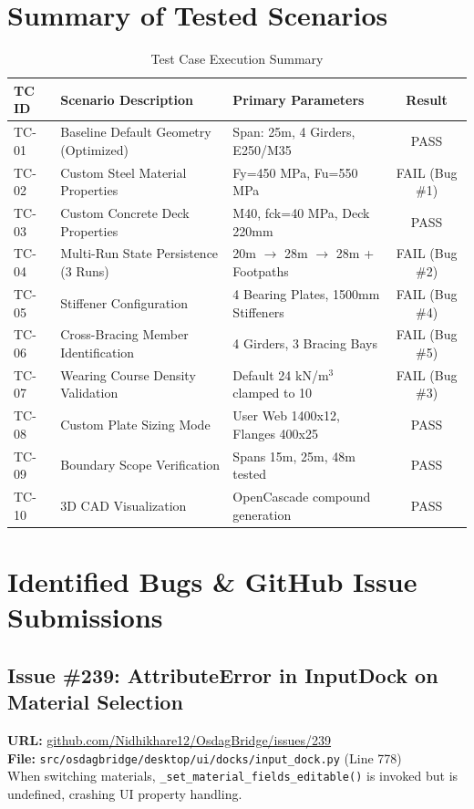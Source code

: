 \documentclass[10pt,a4paper]{article}
\begin{document}
\section{Summary of Tested Scenarios}
\begin{table}[h]
\centering
\small
\begin{tabular}{lp{6cm}p{4cm}c}
\toprule
\textbf{TC ID} & \textbf{Scenario Description} & \textbf{Primary Parameters} & \textbf{Result} \\
\midrule
TC-01 & Baseline Default Geometry (Optimized) & Span: 25m, 4 Girders, E250/M35 & PASS \\
TC-02 & Custom Steel Material Properties & Fy=450 MPa, Fu=550 MPa & FAIL (Bug \#1) \\
TC-03 & Custom Concrete Deck Properties & M40, fck=40 MPa, Deck 220mm & PASS \\
TC-04 & Multi-Run State Persistence (3 Runs) & 20m $\rightarrow$ 28m $\rightarrow$ 28m + Footpaths & FAIL (Bug \#2) \\
TC-05 & Stiffener Configuration & 4 Bearing Plates, 1500mm Stiffeners & FAIL (Bug \#4) \\
TC-06 & Cross-Bracing Member Identification & 4 Girders, 3 Bracing Bays & FAIL (Bug \#5) \\
TC-07 & Wearing Course Density Validation & Default 24 kN/m$^3$ clamped to 10 & FAIL (Bug \#3) \\
TC-08 & Custom Plate Sizing Mode & User Web 1400x12, Flanges 400x25 & PASS \\
TC-09 & Boundary Scope Verification & Spans 15m, 25m, 48m tested & PASS \\
TC-10 & 3D CAD Visualization & OpenCascade compound generation & PASS \\
\bottomrule
\end{tabular}
\caption{Test Case Execution Summary}
\end{table}

\section{Identified Bugs \& GitHub Issue Submissions}

\subsection{Issue \#239: AttributeError in InputDock on Material Selection}
\textbf{URL:} \href{https://github.com/Nidhikhare12/OsdagBridge/issues/239}{github.com/Nidhikhare12/OsdagBridge/issues/239}\\
\textbf{File:} \texttt{src/osdagbridge/desktop/ui/docks/input\_dock.py} (Line 778)\\
When switching materials, \texttt{\_set\_material\_fields\_editable()} is invoked but is undefined, crashing UI property handling.
\end{document}

